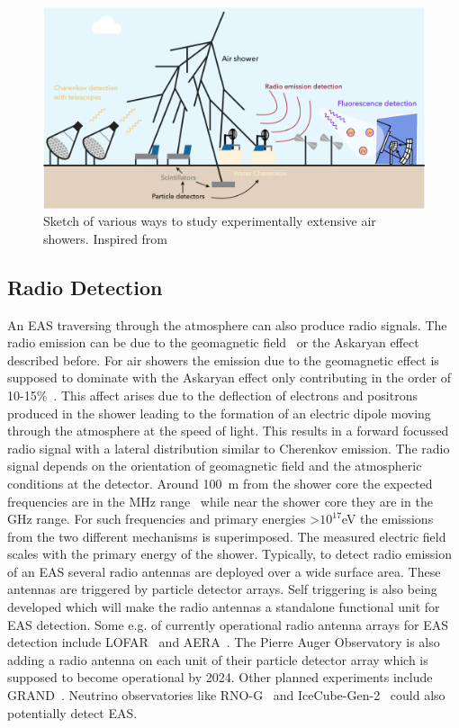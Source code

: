 \begin{figure}[t!]
    \centering
    \includegraphics[width=14.5cm]{thesis_figures/EAS/EAS-Detection-Techniques-mine.pdf}
    \caption{Sketch of various ways to study experimentally extensive air showers. Inspired from~\cite{article_2001_kampert}} 
    \label{fig:EAS_det_techniques}
\end{figure}


\subsection{Radio Detection}
\label{sec:EAS_rad}
An EAS traversing through the atmosphere can also produce radio signals. The radio emission can be due to the geomagnetic field~\cite{1966RSPSA.289..206K} or the Askaryan effect~\cite{Askaryan:1961pfb} described before. For air showers the emission due to the geomagnetic effect is supposed to dominate with the Askaryan effect only contributing in the order of 10-15\%~\cite{osti_4100652}. This affect arises due to the deflection of electrons and positrons produced in the shower leading to the formation of an electric dipole moving through the atmosphere at the speed of light. This results in a forward focussed radio signal with a lateral distribution similar to Cherenkov emission. The radio signal depends on the orientation of geomagnetic field and the atmospheric conditions at the detector. Around 100 m from the shower core the expected frequencies are in the MHz range~\cite{Huege_2016} while near the shower core they are in the GHz range. For such frequencies and primary energies >$10^{17}$eV the emissions from the two different mechanisms is superimposed. The measured electric field scales with the primary energy of the shower. Typically, to detect radio emission of an EAS several radio antennas are deployed over a wide surface area. These antennas are triggered by particle detector arrays. Self triggering is also being developed which will make the radio antennas a standalone functional unit for EAS detection. Some e.g. of currently operational radio antenna arrays for EAS detection include LOFAR~\cite{2013A&A...556A...2V} and AERA~\cite{PhysRevD.93.122005}. The Pierre Auger Observatory is also adding a radio antenna on each unit of their particle detector array which is supposed to become operational by 2024. Other planned experiments include GRAND~\cite{fang2017giantradioarrayneutrino}. Neutrino observatories like RNO-G~\cite{Aguilar_2021} and IceCube-Gen-2~\cite{Aartsen_2021_Gen-2} could also potentially detect EAS.  

